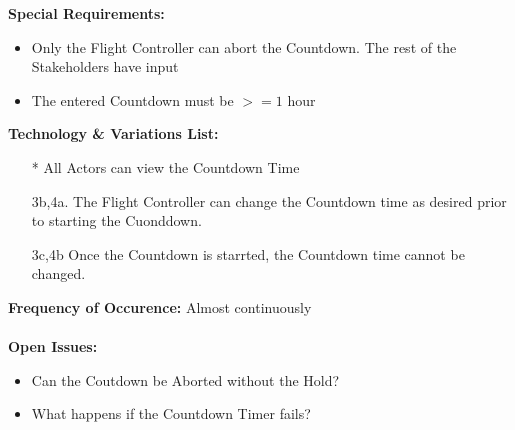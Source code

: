 \documentclass[letterpaper]{article}
\begin{document}
\textbf{Special Requirements:}\\
\begin{itemize}
\item Only the Flight Controller can abort the Countdown.  The rest of
the Stakeholders have input
\item The entered Countdown must be $>= 1$ hour
\end{itemize}
\textbf{Technology \& Variations List:}
\begin{itemize}
\item[*]All Actors can view the Countdown Time
\item[3b,4a.]The Flight Controller can change the Countdown time as
desired prior to starting the Cuonddown.
\item[3c,4b]Once the Countdown is starrted,  the Countdown time cannot
 be changed.
\end{itemize}
\textbf{Frequency of Occurence:  }Almost continuously\\\\
\textbf{Open Issues:}
\begin{itemize}
\item Can the Coutdown be Aborted without the Hold?
\item What happens if the Countdown Timer fails?
\end{itemize}
\end{document}
